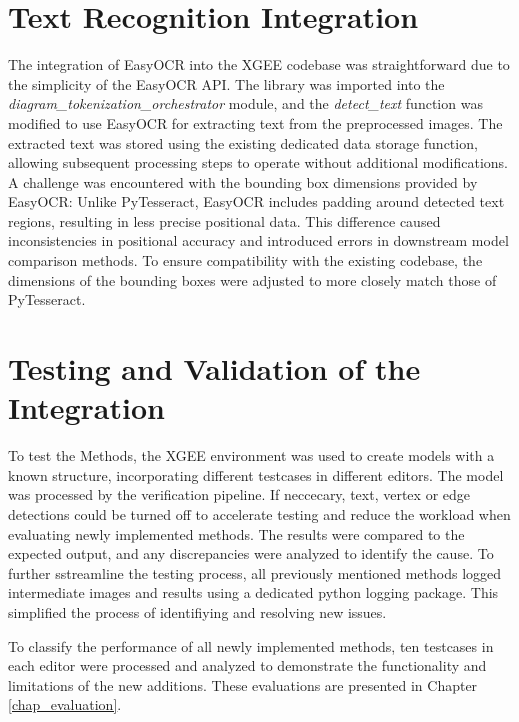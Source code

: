 \section{Text Recognition Integration}
The integration of EasyOCR into the XGEE codebase was straightforward due to the simplicity of the EasyOCR API. The library was imported into the \textit{diagram\_tokenization\_orchestrator} module, and the \textit{detect\_text} function was modified to use EasyOCR for extracting text from the preprocessed images. The extracted text was stored using the existing dedicated data storage function, allowing subsequent processing steps to operate without additional modifications.\\
A challenge was encountered with the bounding box dimensions provided by EasyOCR: Unlike PyTesseract, EasyOCR includes padding around detected text regions, resulting in less precise positional data. This difference caused inconsistencies in positional accuracy and introduced errors in downstream model comparison methods. To ensure compatibility with the existing codebase, the dimensions of the bounding boxes were adjusted to more closely match those of PyTesseract.

\section{Testing and Validation of the Integration}
To test the Methods, the XGEE environment was used to create models with a known structure, incorporating different testcases in different editors. The model was processed by the verification pipeline. If neccecary, text, vertex or edge detections could be turned off to accelerate testing and reduce the workload when evaluating newly implemented methods. The results were compared to the expected output, and any discrepancies were analyzed to identify the cause. To further sstreamline the testing process, all previously mentioned methods logged intermediate images and results using a dedicated python logging package. This simplified the process of identifiying and resolving new issues.

To classify the performance of all newly implemented methods, ten testcases in each editor were processed and analyzed to demonstrate the functionality and limitations of the new additions. These evaluations are presented in Chapter \ref{chap_evaluation}.